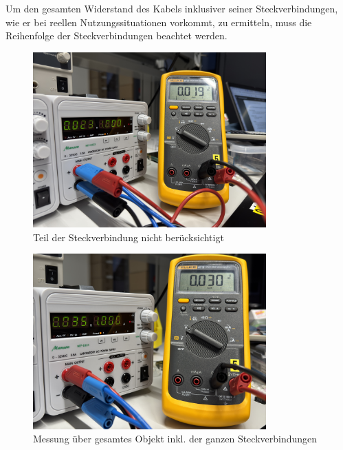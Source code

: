 \documentclass[a4paper,12pt]{article}
\begin{document}
\noindent Um den gesamten Widerstand des Kabels inklusiver seiner Steckverbindungen, wie er bei reellen Nutzungssituationen vorkommt, zu ermitteln, muss die Reihenfolge der Steckverbindungen beachtet werden. 

\begin{figure}[H]
    \centering
    \includegraphics[width=0.8\textwidth]{../Quellen/Labor2/Fotos/IMG_3983.jpeg}
\caption{Teil der Steckverbindung nicht berücksichtigt}
\end{figure}

\begin{figure}[H]
    \centering
    \includegraphics[width=0.8\textwidth]{../Quellen/Labor2/Fotos/IMG_3982.jpeg}
\caption{Messung über gesamtes Objekt inkl. der ganzen Steckverbindungen}
\end{figure}
\end{document}
